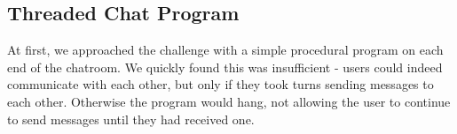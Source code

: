 \documentclass{article}
\begin{document}






\subsection{Threaded Chat Program}

At first, we approached the challenge with a simple procedural program on each end of the chatroom. We quickly found this was insufficient - users could indeed communicate with each other, but only if they took turns sending messages to each other. Otherwise the program would hang, not allowing the user to continue to send messages until they had received one.
\end{document}
